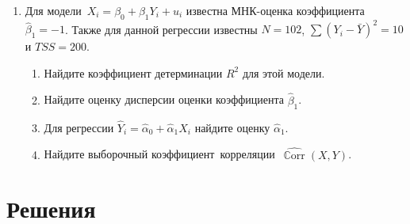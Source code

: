 \documentclass[12pt]{article}
\DeclareMathOperator{\Corr}{\mathbb{C}orr}
\def \hb{\hat{\beta}}
\def \hCorr{\widehat{\Corr}}
\theoremstyle{definition}
\begin{document}
\begin{enumerate}
\item Для модели $X_i = \beta_0 + \beta_1 Y_i + u_i$ известна МНК-оценка коэффициента $\hb_1 = -1$. 
Также для данной регрессии известны $N=102$, $\sum (Y_i - \bar Y)^2=10$ и  $TSS=200$. 
\begin{enumerate}
    \item  Найдите коэффициент детерминации $R^2$ для этой модели.
\item Найдите оценку дисперсии оценки коэффициента $\hb_1$.
\item Для регрессии $\hat Y_i = \hat\alpha_0 + \hat\alpha_1 X_i$ найдите оценку $\hat\alpha_1$.
\item Найдите выборочный коэффициент корреляции $\hCorr(X,Y)$.
\end{enumerate}



\end{enumerate}

\newpage

\section{Решения}
\end{document}
